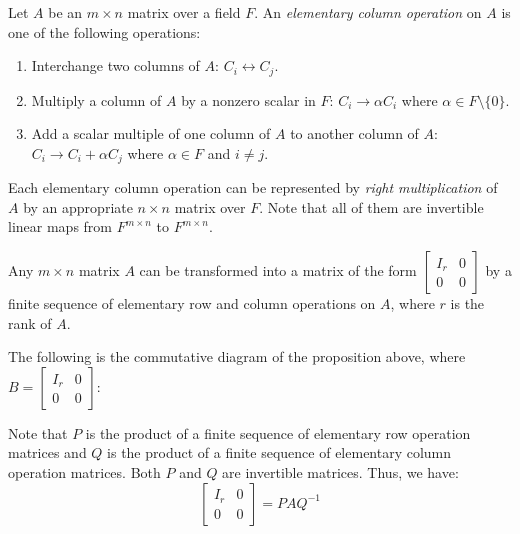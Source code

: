 \documentclass[
	11pt, %
	fleqn, %
	a4paper, %
]{LegrandOrangeBook}
\begin{document}
\begin{definition}
    Let $A$ be an $m \times n$ matrix over a field $F$. An \emph{elementary column operation} on $A$ is one of the following operations:
    \begin{enumerate}
        \item Interchange two columns of $A$: $C_i \leftrightarrow C_j$.
        \item Multiply a column of $A$ by a nonzero scalar in $F$: $C_i \to \alpha C_i$ where $\alpha \in F \setminus \{0\}$.
        \item Add a scalar multiple of one column of $A$ to another column of $A$: $C_i \to C_i + \alpha C_j$ where $\alpha \in F$ and $i \neq j$.
    \end{enumerate}
    Each elementary column operation can be represented by \emph{right multiplication} of $A$ by an appropriate $n \times n$ matrix over $F$. Note that all of them are invertible linear maps from $F^{m \times n}$ to $F^{m \times n}$.
\end{definition}

\begin{proposition}
    Any $m \times n$ matrix $A$ can be transformed into a matrix of the form $\begin{bmatrix}
        I_r & 0 \\
        0 & 0
    \end{bmatrix}$ by a finite sequence of elementary row and column operations on $A$, where $r$ is the rank of $A$.
\end{proposition}

The following is the commutative diagram of the proposition above, where $B = \begin{bmatrix}
    I_r & 0 \\
    0 & 0
\end{bmatrix}$:

\begin{center}
\end{center}


Note that $P$ is the product of a finite sequence of elementary row operation matrices and $Q$ is the product of a finite sequence of elementary column operation matrices. Both $P$ and $Q$ are invertible matrices. Thus, we have:
\[
    \begin{bmatrix}
        I_r & 0 \\
        0 & 0
    \end{bmatrix} = P A Q^{-1}
\]
\end{document}
